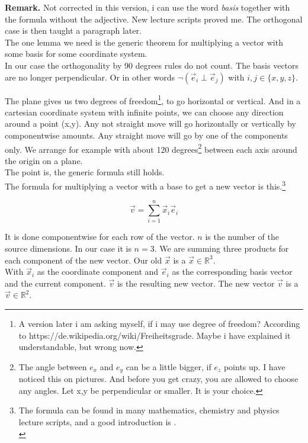 \documentclass[a4paper]{article}
\begin{document}
\textbf{Remark.} Not corrected in this version, i can use the word \emph{basis} together with the formula without the adjective. New lecture scripts proved me. The orthogonal case is then taught a paragraph later.\\

The one lemma we need is the generic theorem for multiplying a vector with some basis for some coordinate system.\\

In our case the orthogonality by 90 degrees rules do not count. The basis vectors are no longer perpendicular. Or in other words
$\neg \left( \vec{e}_i \perp \vec{e}_j \right)$ with $i,j \in \{x,y,z\}.$

The plane gives us two degrees of freedom\footnote{A version later i am asking myself, if i may use degree of freedom? According to https://de.wikipedia.org/wiki/Freiheitsgrade. Maybe i have explained it understandable, but wrong now.}, to go horizontal or vertical. And in a cartesian coordinate system with infinite points, we can choose any direction around a point (x,y).
Any not straight move will go horizontally or vertically by componentwise amounts. Any straight move will go by one of the components only.
We arrange for example with about 120 degrees\footnote{The angle between $e_x$ and $e_y$ can be a little bigger, if $e_z$ points up. I have noticed this on pictures. And before you get crazy, you are allowed to choose any angles. Let x,y be perpendicular or smaller. It is your choice.} between each axis around the origin on a plane. \\

The point is, the generic formula still holds.\\
The formula for multiplying a vector with a base to get a new vector is this.\footnote{The formula can be found in many mathematics, chemistry and physics lecture scripts, and a good introduction is \cite{Strang1}.\\}

\begin{displaymath}
\vec{v} = \displaystyle\sum_{i=1}^{n} \vec{x}_i\vec{e}_i
\end{displaymath}

It is done componentwise for each row of the vector. $n$ is the number of the source dimensions. In our case it is $n = 3$. 
We are summing three products for each component of the new vector. Our old $\vec{x}$ is a $\vec{x} \in \mathbb{R}^3$.\\
With $\vec{x}_i$ as the coordinate component and $\vec{e}_i$ as the corresponding basis vector and the current component. $\vec{v}$ is the resulting new vector. 
The new vector $\vec{v}$ is a $\vec{v} \in \mathbb{R}^2$.\\
\end{document}
